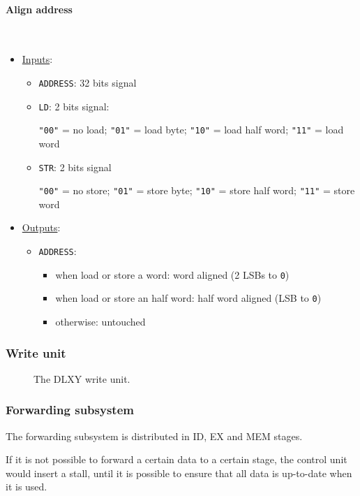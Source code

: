 \paragraph{Align address} \mbox{} \\
\begin{itemize}
	\item \underline{Inputs}:
		\begin{itemize}
			\item \texttt{ADDRESS}: 32 bits signal
			\item \texttt{LD}: 2 bits signal:

				\texttt{"00"} = no load; \texttt{"01"} = load byte;
				\texttt{"10"} = load half word; \texttt{"11"} = load word
			\item \texttt{STR}: 2 bits signal

				\texttt{"00"} = no store; \texttt{"01"} = store byte;
				\texttt{"10"} = store half word; \texttt{"11"} = store word
		\end{itemize}
	\item \underline{Outputs}:
		\begin{itemize}
			\item \texttt{ADDRESS}:
				\begin{itemize}
					\item when load or store a word: word aligned (2 LSBs to \texttt{0})
					\item when load or store an half word: half word aligned (LSB to \texttt{0})
					\item otherwise: untouched
				\end{itemize}
		\end{itemize}
\end{itemize}

\subsubsection{Write unit}
\begin{figure}[H]
	\centering
	\caption{The DLXY write unit.}
	\label{fig:write_unit}
\end{figure}

\subsubsection{Forwarding subsystem}
The forwarding subsystem is distributed in ID, EX and MEM stages.

If it is not possible to forward a certain data to a certain stage, the control
unit would insert a stall, until it is possible to ensure that all data is
up-to-date when it is used.

